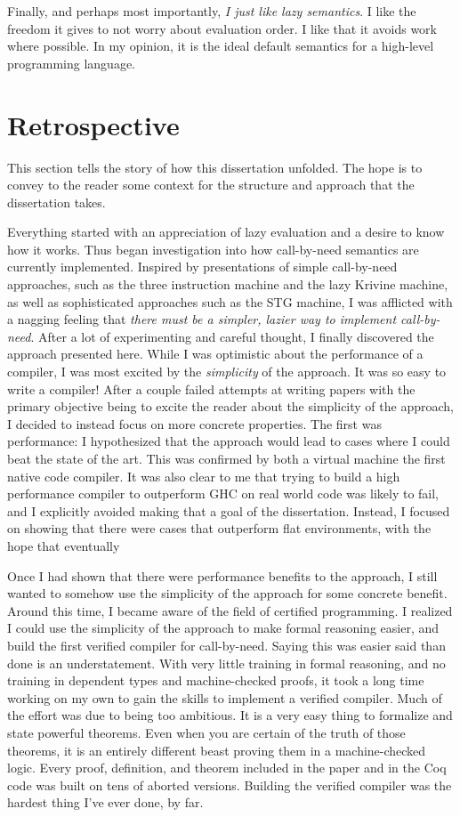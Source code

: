 Finally, and perhaps most importantly, \emph{I just like lazy semantics}. I like
the freedom it gives to not worry about evaluation order. I like that it avoids
work where possible. In my opinion, it is the ideal default semantics for a
high-level programming language.   

\section{Retrospective}

This section tells the story of how this dissertation unfolded. The hope is to
convey to the reader some context for the structure and approach that the
dissertation takes. 

Everything started with an appreciation of lazy evaluation and a desire to know
how it works. Thus began investigation into how call-by-need semantics are
currently implemented. Inspired by presentations of simple call-by-need
approaches, such as the three instruction machine and the lazy Krivine machine,
as well as sophisticated approaches such as the STG machine, I was afflicted
with a nagging feeling that \emph{there must be a simpler, lazier way to
implement call-by-need}. After a lot of experimenting and careful thought, I
finally discovered the approach presented here. While I was optimistic about the
performance of a compiler, I was most excited by the \emph{simplicity} of the
approach. It was so easy to write a compiler! After a couple failed attempts at
writing papers with the primary objective being to excite the reader about
the simplicity of the approach, I decided to instead focus on more concrete
properties. The first was performance: I hypothesized that the approach would
lead to cases where I could beat the state of the art. This was confirmed by
both a virtual machine the first native code compiler. It was also clear to me
that trying to build a high performance compiler to outperform GHC on real world
code was likely to fail, and I explicitly avoided making that a goal of the
dissertation. Instead, I focused on showing that there were cases that
outperform flat environments, with the hope that eventually 

Once I had shown that there were performance benefits to the approach, I still
wanted to somehow use the simplicity of the approach for some concrete benefit.
Around this time, I became aware of the field of certified programming. I
realized I could use the simplicity of the approach to make formal reasoning
easier, and build the first verified compiler for call-by-need. Saying this was
easier said than done is an understatement. With very little training in formal
reasoning, and no training in dependent types and machine-checked proofs, it
took a long time working on my own to gain the skills to implement a verified
compiler. Much of the effort was due to being too ambitious. It is a very easy
thing to formalize and state powerful theorems. Even when you are certain of the
truth of those theorems, it is an entirely different beast proving them in a
machine-checked logic. Every proof, definition, and theorem included in the
paper and in the Coq code was built on tens of aborted versions. Building the
verified compiler was the hardest thing I've ever done, by far.

